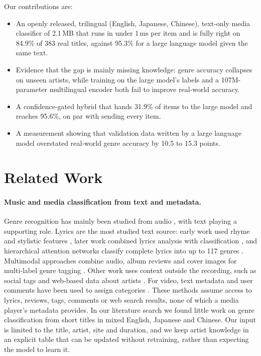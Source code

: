 \documentclass[11pt]{article}
\begin{document}
Our contributions are:
\begin{itemize}
    \item An openly released, trilingual (English, Japanese, Chinese), text-only media classifier of 2.1\,MB that runs in under 1\,ms per item and is fully right on 84.9\% of 383 real titles, against 95.3\% for a large language model given the same text.
    \item Evidence that the gap is mainly missing knowledge: genre accuracy collapses on unseen artists, while training on the large model's labels and a 107M-parameter multilingual encoder both fail to improve real-world accuracy.
    \item A confidence-gated hybrid that hands 31.9\% of items to the large model and reaches 95.6\%, on par with sending every item.
    \item A measurement showing that validation data written by a large language model overstated real-world genre accuracy by 10.5 to 15.3 points.
\end{itemize}

\section{Related Work}
\label{sec:related}

\paragraph{Music and media classification from text and metadata.}
Genre recognition has mainly been studied from audio \citep{tzanetakis2002musical}, with text playing a supporting role. Lyrics are the most studied text source: early work used rhyme and stylistic features \citep{mayer2008rhyme}, later work combined lyrics analysis with classification \citep{fell2014lyrics}, and hierarchical attention networks classify complete lyrics into up to 117 genres \citep{tsaptsinos2017lyrics}. Multimodal approaches combine audio, album reviews and cover images for multi-label genre tagging \citep{oramas2017multilabel}. Other work uses context outside the recording, such as social tags \citep{lamere2008social} and web-based data about artists \citep{knees2004artist}. For video, text metadata and user comments have been used to assign categories \citep{filippova2011improved}. These methods assume access to lyrics, reviews, tags, comments or web search results, none of which a media player's metadata provides. In our literature search we found little work on genre classification from short titles in mixed English, Japanese and Chinese. Our input is limited to the title, artist, site and duration, and we keep artist knowledge in an explicit table that can be updated without retraining, rather than expecting the model to learn it.
\end{document}
